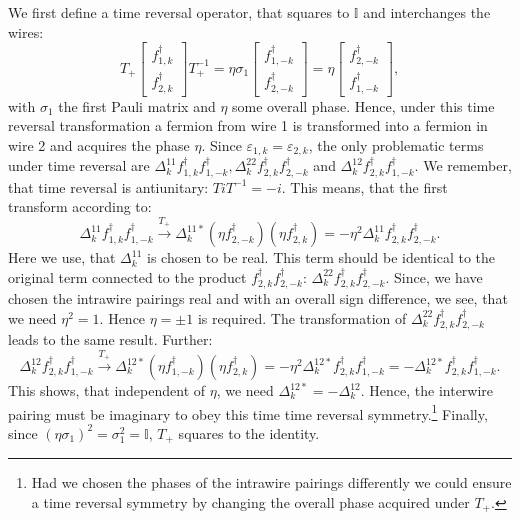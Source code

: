 We first define a time reversal operator, that squares to $\mathbb{I}$ and interchanges the wires: 
\begin{equation}
T_+\begin{bmatrix} f^\dagger_{1,k} \\ f^\dagger_{2,k} \end{bmatrix} T_+^{-1} = \eta\sigma_1 \begin{bmatrix} f^\dagger_{1,-k} \\ f^\dagger_{2,-k} \end{bmatrix} = \eta\begin{bmatrix} f^\dagger_{2,-k} \\ f^\dagger_{1,-k} \end{bmatrix},\nonumber
\end{equation} 
with $\sigma_1$ the first Pauli matrix and $\eta$ some overall phase. Hence, under this time reversal transformation a fermion from wire 1 is transformed into a fermion in wire 2 and acquires the phase $\eta$. Since $\varepsilon_{1,k} = \varepsilon_{2,k}$, the only problematic terms under time reversal are $\Delta^{11}_k f^\dagger_{1,k}f^\dagger_{1,-k}, \Delta^{22}_k f^\dagger_{2,k}f^\dagger_{2,-k}$ and $\Delta^{12}_kf^\dagger_{2,k}f^\dagger_{1,-k}$. We remember, that time reversal is antiunitary: $TiT^{-1} = -i$. This means, that the first transform according to:
\begin{equation}
\Delta^{11}_k f^\dagger_{1,k}f^\dagger_{1,-k} \overset{T_+}{\to} \Delta^{11*}_k \left(\eta f^\dagger_{2,-k}\right)\left(\eta f^\dagger_{2,k}\right) = -\eta^2\Delta^{11}_k f^\dagger_{2,k}f^\dagger_{2,-k}. \nonumber
\end{equation}
Here we use, that $\Delta^{11}_k$ is chosen to be real. This term should be identical to the original term connected to the product $f^\dagger_{2,k}f^\dagger_{2,-k}$: $\Delta^{22}_k f^\dagger_{2,k}f^\dagger_{2,-k}$. Since, we have chosen the intrawire pairings real and with an overall sign difference, we see, that we need $\eta^2 = 1$. Hence $\eta = \pm 1$ is required. The transformation of $\Delta^{22}_k f^\dagger_{2,k}f^\dagger_{2,-k}$ leads to the same result. Further:
\begin{equation}
\Delta^{12}_k f^\dagger_{2,k}f^\dagger_{1,-k} \overset{T_+}{\to} \Delta^{12*}_k \left(\eta f^\dagger_{1,-k}\right)\left( \eta f^\dagger_{2,k}\right) = -\eta^2 \Delta^{12*}_k f^\dagger_{2,k}f^\dagger_{1,-k} = - \Delta^{12*}_k f^\dagger_{2,k}f^\dagger_{1,-k}. \nonumber
\end{equation}
This shows, that independent of $\eta$, we need $\Delta^{12*}_k = - \Delta^{12}_k$. Hence, the interwire pairing must be imaginary to obey this time time reversal symmetry.\footnote{Had we chosen the phases of the intrawire pairings differently we could ensure a time reversal symmetry by changing the overall phase acquired under $T_+$.} Finally, since $(\eta \sigma_1)^2 = \sigma_1^2 = \mathbb{I}$, $T_+$ squares to the identity.  

